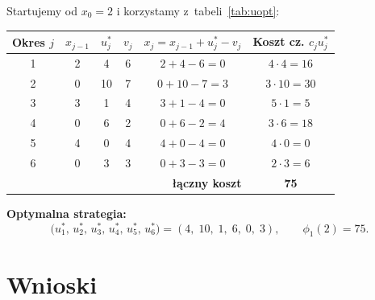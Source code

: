 \documentclass[12pt,a4paper]{article}
\begin{document}
Startujemy od $x_0 = 2$ i korzystamy z~tabeli~\ref{tab:uopt}:

\begin{center}
\begin{tabular}{cccccc}
\toprule
Okres $j$ & $x_{j-1}$ & $u_j^*$ & $v_j$ & $x_j = x_{j-1}+u_j^*-v_j$ & Koszt cz. $c_j u_j^*$ \\
\midrule
1 & 2  & 4  & 6 & $2+4-6=0$   & $4\cdot4=16$  \\
2 & 0  & 10 & 7 & $0+10-7=3$  & $3\cdot10=30$ \\
3 & 3  & 1  & 4 & $3+1-4=0$   & $5\cdot1=5$   \\
4 & 0  & 6  & 2 & $0+6-2=4$   & $3\cdot6=18$  \\
5 & 4  & 0  & 4 & $4+0-4=0$   & $4\cdot0=0$   \\
6 & 0  & 3  & 3 & $0+3-3=0$   & $2\cdot3=6$   \\
\midrule
\multicolumn{5}{r}{\textbf{\l{}\k{a}czny koszt}} & \textbf{75} \\
\bottomrule
\end{tabular}
\end{center}

\bigskip
\noindent
\textbf{Optymalna strategia:}
\[
    \bigl(u_1^*,\, u_2^*,\, u_3^*,\, u_4^*,\, u_5^*,\, u_6^*\bigr)
    = (4,\; 10,\; 1,\; 6,\; 0,\; 3),
    \qquad \phi_1(2) = 75.
\]

\section{Wnioski}
\end{document}
